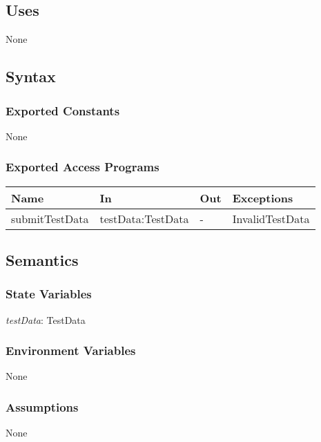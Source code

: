 \documentclass[12pt, titlepage]{article}
\begin{document}
\subsection{Uses}

None

\subsection{Syntax}

\subsubsection{Exported Constants}

None

\subsubsection{Exported Access Programs}

\begin{center}
\begin{tabular}{p{4cm} p{3cm} p{2cm} p{3cm}}
\hline
\textbf{Name} & \textbf{In} & \textbf{Out} & \textbf{Exceptions} \\
\hline
submitTestData & testData:TestData & - & InvalidTestData \\
\hline
\end{tabular}
\end{center}

\subsection{Semantics}

\subsubsection{State Variables}

\textit{testData}: TestData

\subsubsection{Environment Variables}

None

\subsubsection{Assumptions}

None
\end{document}

